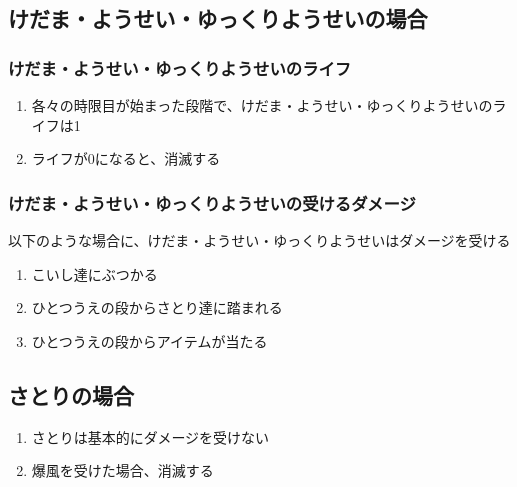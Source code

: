 \subsection{けだま・ようせい・ゆっくりようせいの場合}

\subsubsection{けだま・ようせい・ゆっくりようせいのライフ}
\begin{enumerate}[label={\sarrow}]
\item 各々の時限目が始まった段階で、けだま・ようせい・ゆっくりようせいのライフは1
\item ライフが0になると、消滅する
\end{enumerate}

\subsubsection{けだま・ようせい・ゆっくりようせいの受けるダメージ}
以下のような場合に、けだま・ようせい・ゆっくりようせいはダメージを受ける
\begin{enumerate}[label={\sarrow}]
\item こいし達にぶつかる
\item ひとつうえの段からさとり達に踏まれる
\item ひとつうえの段からアイテムが当たる
\end{enumerate}


\subsection{さとりの場合}
\begin{enumerate}[label={\sarrow}]
\item さとりは基本的にダメージを受けない
\item 爆風を受けた場合、消滅する
\end{enumerate}


